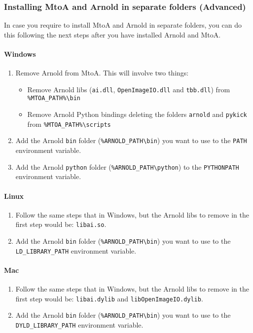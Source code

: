 \subsubsection{Installing MtoA and Arnold in separate folders (Advanced)}
In case you require to install MtoA and Arnold in separate folders, you can do this following the next steps after you have installed Arnold and MtoA.
\paragraph{Windows}
\begin{enumerate}
\item Remove Arnold from MtoA. This will involve two things:
\begin{itemize}
   \item Remove Arnold libs (\texttt{ai.dll}, \texttt{OpenImageIO.dll} and \texttt{tbb.dll}) from \texttt{\%MTOA\_PATH\%\textbackslash bin}
   \item Remove Arnold Python bindings deleting the folders \texttt{arnold} and \texttt{pykick} from \texttt{\%MTOA\_PATH\%\textbackslash scripts}
\end{itemize}
\item Add the Arnold \texttt{bin} folder (\texttt{\%ARNOLD\_PATH\textbackslash bin}) you want to use to the \texttt{PATH} environment variable.
\item Add the Arnold \texttt{python} folder (\texttt{\%ARNOLD\_PATH\textbackslash python}) to the \texttt{PYTHONPATH} environment variable.
\end{enumerate}

\paragraph{Linux}
\begin{enumerate}
\item Follow the same steps that in Windows, but the Arnold libs to remove in the first step would be: \texttt{libai.so}.
\item Add the Arnold \texttt{bin} folder (\texttt{\%ARNOLD\_PATH\textbackslash bin}) you want to use to the \texttt{LD\_LIBRARY\_PATH} environment variable.
\end{enumerate}

\paragraph{Mac}
\begin{enumerate}
\item Follow the same steps that in Windows, but the Arnold libs to remove in the first step would be: \texttt{libai.dylib} and \texttt{libOpenImageIO.dylib}.
\item Add the Arnold \texttt{bin} folder (\texttt{\%ARNOLD\_PATH\textbackslash bin}) you want to use to the \texttt{DYLD\_LIBRARY\_PATH} environment variable.
\end{enumerate}

